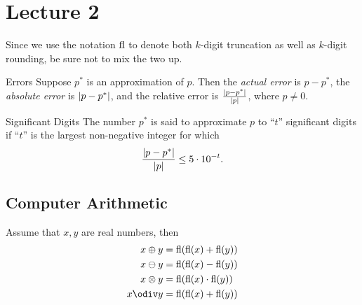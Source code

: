 \documentclass[class=article, crop=false]{standalone}
\begin{document}
  \section{Lecture 2}
  \begin{note}{}
    Since we use the notation $\operatorname{fl}$ to denote both $k$-digit truncation as well as $k$-digit rounding, be sure not to mix the two up.
  \end{note}
  \begin{definition}{Errors}
    Suppose $p^*$ is an approximation of $p$. Then the \emph{actual error} is $p - p^*$, the \emph{absolute error} is $\left\lvert p - p^* \right\rvert$, and the relative error is $\frac{\left\lvert p - p^* \right\rvert}{\left\lvert p \right\rvert}$, where $p\neq 0$.
  \end{definition}
  \begin{definition}{Significant Digits}
    The number $p^*$ is said to approximate $p$ to ``$t$'' significant digits if ``$t$'' is the largest non-negative integer for which
    \[
      \frac{\left\lvert p - p^* \right\rvert}{\left\lvert p \right\rvert}\leq 5\cdot 10^{-t}.
    \]
  \end{definition}
  \subsection{Computer Arithmetic}
  Assume that $x, y$ are real numbers, then
  \begin{align*}
    x\oplus y &= \fl(\fl(x) + \fl(y)) \\ 
    x\ominus y &= \fl(\fl(x) - \fl(y)) \\ 
    x\otimes y &= \fl(\fl(x) \cdot  \fl(y)) \\ 
    x\odiv y &= \fl(\fl(x) + \fl(y))
  \end{align*}
\end{document}
